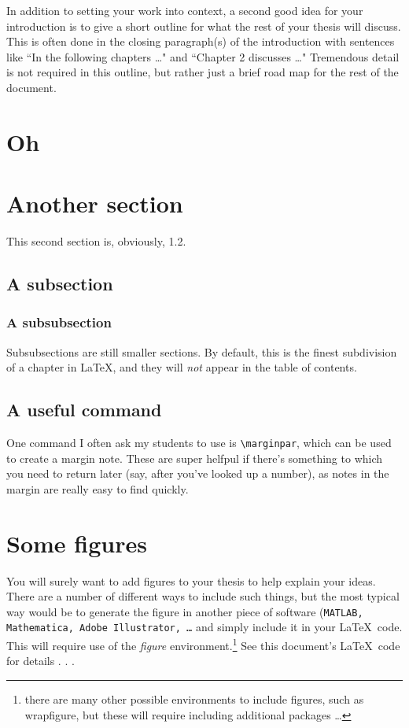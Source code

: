 In addition to setting your work into context, a second good idea for your introduction is to give a short outline for what the rest of your thesis will discuss.  This is often done in the closing paragraph(s) of the introduction with sentences like ``In the following chapters \ldots " and ``Chapter 2 discusses \ldots"  Tremendous detail is not required in this outline, but rather just a brief road map for the rest of the document.

\section{Oh}

\section{Another section}

This second section is, obviously, 1.2.

\subsection{A subsection}

\subsubsection{A subsubsection}

Subsubsections are still smaller sections.  By default, this is the finest subdivision of a chapter in \LaTeX, and they will \emph{not} appear in the table of contents.  

\subsection{A useful command}

One command I often ask my students to use is \texttt{\textbackslash marginpar}, which can be used to create a margin note.  These are super helfpul if there's something to which you need to return later (say, after you've looked up a number), as notes in the margin are really easy to find quickly.  

\section{Some figures}

You will surely want to add figures to your thesis to help explain your ideas.  There are a number of different ways to include such things, but the most typical way would be to generate the figure in another piece of software (\texttt{MATLAB, Mathematica, Adobe Illustrator, \ldots} and simply include it in your \LaTeX ~code.  This will require use of the \emph{figure} environment.\footnote{there are many other possible environments to include figures, such as wrapfigure, but these will require including additional packages \ldots}  See this document's \LaTeX ~code for details . . .

